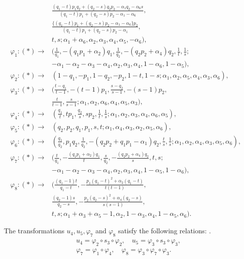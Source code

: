 \begin{thm}
\begin{align*}
        &\frac{(q_1-t)p_1q_2+(q_2-s)q_2p_2-\alpha_1q_2-\alpha_6s}{(q_1-t)p_1+(q_2-s)p_2-\alpha_1-\alpha_6},\\
        &\frac{\{(q_1-t)p_1+(q_2-s)p_2-\alpha_1-\alpha_6\}p_2}{(q_1-t)p_1+(q_2-s)p_2-\alpha_1},\\
        &t,s;\alpha_1+\alpha_6,\alpha_2,\alpha_3,\alpha_4,\alpha_5,-\alpha_6),\\
        \varphi_1: (*) \rightarrow &(\frac{1}{q_1},-(q_1p_1+\alpha_2)q_1,\frac{1}{q_2},-(q_2p_2+\alpha_4)q_2,\frac{1}{t},\frac{1}{s}; \\
        &-\alpha_1-\alpha_2-\alpha_3-\alpha_4,\alpha_2,\alpha_3,\alpha_4,1-\alpha_6,1-\alpha_5),\\
        \varphi_2: (*) \rightarrow &(1-q_1,-p_1,1-q_2,-p_2,1-t,1-s;\alpha_1,\alpha_2,\alpha_5,\alpha_4,\alpha_3,\alpha_6),\\
        \varphi_3: (*) \rightarrow &(\frac{t-q_1}{t-1},-(t-1)p_1,\frac{s-q_2}{s-1},-(s-1)p_2,\\
        &\frac{t}{t-1},\frac{s}{s-1};\alpha_1,\alpha_2,\alpha_6,\alpha_4,\alpha_5,\alpha_3),\\
        \varphi_4: (*) \rightarrow &(\frac{q_1}{t},tp_1,\frac{q_2}{s},sp_2,\frac{1}{t},\frac{1}{s};\alpha_1,\alpha_2,\alpha_3,\alpha_4,\alpha_6,\alpha_5),\\
        \varphi_5: (*) \rightarrow &(q_2,p_2,q_1,p_1,s,t;\alpha_1,\alpha_4,\alpha_3,\alpha_2,\alpha_5,\alpha_6),\\
        \varphi_6: (*) \rightarrow &(\frac{q_1}{q_2},p_1q_2,\frac{1}{q_2},-(q_2p_2+q_1p_1-\alpha_1)q_2,\frac{t}{s},\frac{1}{s};\alpha_1,\alpha_2,\alpha_4,\alpha_3,\alpha_5,\alpha_6),\\
        \varphi_7: (*) \rightarrow &(\frac{t}{q_1},-\frac{(q_1p_1+\alpha_2)q_1}{t},\frac{s}{q_2},-\frac{(q_2p_2+\alpha_4)q_2}{s},t,s;\\
        &-\alpha_1-\alpha_2-\alpha_3-\alpha_4,\alpha_2,\alpha_3,\alpha_4,1-\alpha_5,1-\alpha_6),\\
        \varphi_8: (*) \rightarrow &(\frac{(q_1-1)t}{q_1-t},-\frac{p_1(q_1-t)^2+\alpha_2(q_1-t)}{t(t-1)},\\
        &\frac{(q_2-1)s}{q_2-s},-\frac{p_2(q_2-s)^2+\alpha_4(q_2-s)}{s(s-1)},\\
        &t,s;\alpha_1+\alpha_3+\alpha_5-1,\alpha_2,1-\alpha_3,\alpha_4,1-\alpha_5,\alpha_6).
        \end{align*}
\end{thm}


\begin{rem}
The transformations $u_4,u_5,\varphi_7$ and $\varphi_8$ satisfy the following relations{\rm : \rm}.
\begin{align}
\begin{split}
&u_4=\varphi_2 \circ s_3 \circ \varphi_2, \quad u_5=\varphi_3 \circ s_3 \circ \varphi_3,\\
&\varphi_7=\varphi_1 \circ \varphi_4, \quad \varphi_8=\varphi_3 \circ \varphi_7 \circ \varphi_3.
\end{split}
\end{align}
\end{rem}



